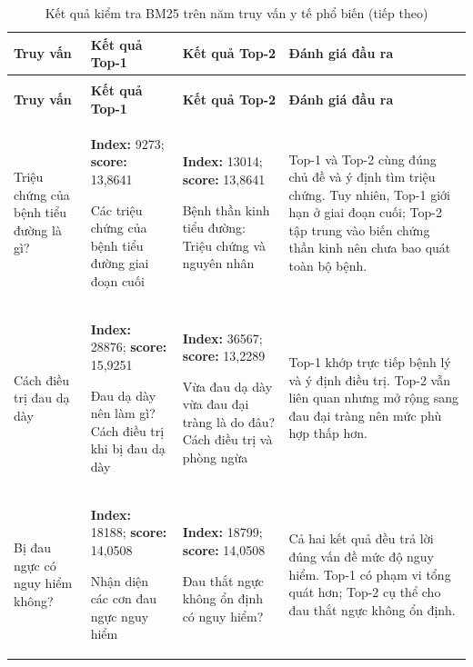 \documentclass[12pt,a4paper,oneside]{report}
\begin{document}
\begingroup
\footnotesize
{}
\setlength{\tabcolsep}{3pt}
\begin{longtable}{@{}>{\raggedright\arraybackslash}p{2.55cm}>{\raggedright\arraybackslash}p{3.65cm}>{\raggedright\arraybackslash}p{3.65cm}>{\raggedright\arraybackslash}p{5.35cm}@{}}
\caption{Kết quả kiểm tra BM25 trên năm truy vấn y tế }
\label{tab:bm25-test-queries}\\
\toprule
\textbf{Truy vấn} & \textbf{Kết quả Top-1} & \textbf{Kết quả Top-2} & \textbf{Đánh giá đầu ra}\\
\midrule
\endfirsthead

\caption[]{Kết quả kiểm tra BM25 trên năm truy vấn y tế phổ biến (tiếp theo)}\\
\toprule
\textbf{Truy vấn} & \textbf{Kết quả Top-1} & \textbf{Kết quả Top-2} & \textbf{Đánh giá đầu ra}\\
\midrule
\endhead

\bottomrule
\endlastfoot

Triệu chứng của bệnh tiểu đường là gì?
& \textbf{Index:} 9273; \textbf{score:} 13{,}8641\par Các triệu chứng của bệnh tiểu đường giai đoạn cuối
& \textbf{Index:} 13014; \textbf{score:} 13{,}8641\par Bệnh thần kinh tiểu đường: Triệu chứng và nguyên nhân
& Top-1 và Top-2 cùng đúng chủ đề và ý định tìm triệu chứng. Tuy nhiên, Top-1 giới hạn ở giai đoạn cuối; Top-2 tập trung vào biến chứng thần kinh nên chưa bao quát toàn bộ bệnh.\\
\midrule

Cách điều trị đau dạ dày
& \textbf{Index:} 28876; \textbf{score:} 15{,}9251\par Đau dạ dày nên làm gì? Cách điều trị khi bị đau dạ dày
& \textbf{Index:} 36567; \textbf{score:} 13{,}2289\par Vừa đau dạ dày vừa đau đại tràng là do đâu? Cách điều trị và phòng ngừa
& Top-1 khớp trực tiếp bệnh lý và ý định điều trị. Top-2 vẫn liên quan nhưng mở rộng sang đau đại tràng nên mức phù hợp thấp hơn.\\
\midrule

Bị đau ngực có nguy hiểm không?
& \textbf{Index:} 18188; \textbf{score:} 14{,}0508\par Nhận diện các cơn đau ngực nguy hiểm
& \textbf{Index:} 18799; \textbf{score:} 14{,}0508\par Đau thắt ngực không ổn định có nguy hiểm?
& Cả hai kết quả đều trả lời đúng vấn đề mức độ nguy hiểm. Top-1 có phạm vi tổng quát hơn; Top-2 cụ thể cho đau thắt ngực không ổn định.\\
\midrule


\end{longtable}
\end{document}
